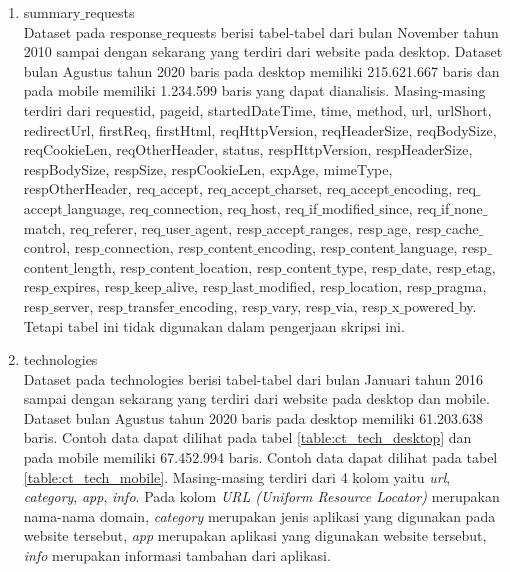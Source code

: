 \begin{enumerate}
\item summary$\_$requests\\
Dataset pada response$\_$requests berisi tabel-tabel dari bulan November tahun 2010 sampai dengan sekarang yang terdiri dari website pada desktop. Dataset bulan Agustus tahun 2020 baris pada desktop memiliki 215.621.667 baris dan pada mobile memiliki 1.234.599 baris yang dapat dianalisis. Masing-masing terdiri dari requestid, pageid, startedDateTime, time, method, url, urlShort, redirectUrl, firstReq, firstHtml, reqHttpVersion, reqHeaderSize, reqBodySize, reqCookieLen, reqOtherHeader, status, respHttpVersion, respHeaderSize, respBodySize, respSize, respCookieLen, expAge, mimeType, respOtherHeader, req$\_$accept, req$\_$accept$\_$charset, req$\_$accept$\_$encoding, req$\_$accept$\_$language, req$\_$connection, req$\_$host, req$\_$if$\_$modified$\_$since, req$\_$if$\_$none$\_$match, req$\_$referer, req$\_$user$\_$agent, resp$\_$accept$\_$ranges, resp$\_$age, resp$\_$cache$\_$control, resp$\_$connection, resp$\_$content$\_$encoding, resp$\_$content$\_$language, resp$\_$content$\_$length, resp$\_$content$\_$location, resp$\_$content$\_$type, resp$\_$date, resp$\_$etag, resp$\_$expires, resp$\_$keep$\_$alive, resp$\_$last$\_$modified, resp$\_$location, resp$\_$pragma, resp$\_$server, resp$\_$transfer$\_$encoding, resp$\_$vary, resp$\_$via, resp$\_$x$\_$powered$\_$by. Tetapi tabel ini tidak digunakan dalam pengerjaan skripsi ini.
\item technologies\\
Dataset pada technologies berisi tabel-tabel dari bulan Januari tahun 2016 sampai dengan sekarang yang terdiri dari website pada desktop dan mobile. Dataset bulan Agustus tahun 2020 baris pada desktop memiliki 61.203.638 baris. Contoh data dapat dilihat pada tabel \ref{table:ct_tech_desktop} dan pada mobile memiliki 67.452.994 baris. Contoh data dapat dilihat pada tabel \ref{table:ct_tech_mobile}. Masing-masing terdiri dari 4 kolom yaitu \textit{url}, \textit{category}, \textit{app}, \textit{info}. Pada kolom \textit{URL (Uniform Resource Locator)} merupakan nama-nama domain, \textit{category} merupakan jenis aplikasi yang digunakan pada website tersebut, \textit{app} merupakan aplikasi yang digunakan website tersebut, \textit{info} merupakan informasi tambahan dari aplikasi. 


\end{enumerate}
